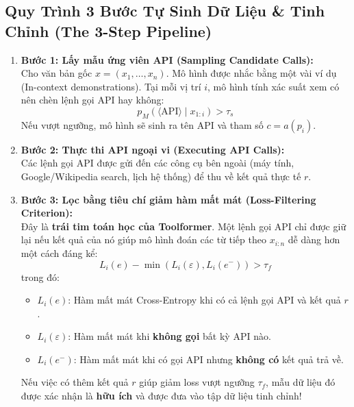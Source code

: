 \documentclass[11pt,a4paper]{article}
\begin{document}
\subsection{Quy Trình 3 Bước Tự Sinh Dữ Liệu \& Tinh Chỉnh (The 3-Step Pipeline)}

\begin{formulationbox}
\begin{enumerate}[leftmargin=1.5em]
    \item \textbf{Bước 1: Lấy mẫu ứng viên API (Sampling Candidate Calls):}\\
    Cho văn bản gốc $x = (x_1, \dots, x_n)$. Mô hình được nhắc bằng một vài ví dụ (In-context demonstrations). Tại mỗi vị trí $i$, mô hình tính xác suất xem có nên chèn lệnh gọi API hay không:
    \begin{equation}
        p_M(\langle\text{API}\rangle \mid x_{1:i}) > \tau_s
    \end{equation}
    Nếu vượt ngưỡng, mô hình sẽ sinh ra tên API và tham số $c = a(p_i)$.
    
    \item \textbf{Bước 2: Thực thi API ngoại vi (Executing API Calls):}\\
    Các lệnh gọi API được gửi đến các công cụ bên ngoài (máy tính, Google/Wikipedia search, lịch hệ thống) để thu về kết quả thực tế $r$.
    
    \item \textbf{Bước 3: Lọc bằng tiêu chí giảm hàm mất mát (Loss-Filtering Criterion):}\\
    Đây là \textbf{trái tim toán học của Toolformer}. Một lệnh gọi API chỉ được giữ lại nếu kết quả của nó giúp mô hình đoán các từ tiếp theo $x_{i:n}$ dễ dàng hơn một cách đáng kể:
    \begin{equation}
        L_i(e) - \min(L_i(\varepsilon), L_i(e^-)) > \tau_f
    \end{equation}
    trong đó:
    \begin{itemize}
        \item $L_i(e)$: Hàm mất mát Cross-Entropy khi có cả lệnh gọi API và kết quả $r$.
        \item $L_i(\varepsilon)$: Hàm mất mát khi \textbf{không gọi} bất kỳ API nào.
        \item $L_i(e^-)$: Hàm mất mát khi có gọi API nhưng \textbf{không có} kết quả trả về.
    \end{itemize}
    Nếu việc có thêm kết quả $r$ giúp giảm loss vượt ngưỡng $\tau_f$, mẫu dữ liệu đó được xác nhận là \textbf{hữu ích} và được đưa vào tập dữ liệu tinh chỉnh!
\end{enumerate}
\end{formulationbox}
\end{document}
